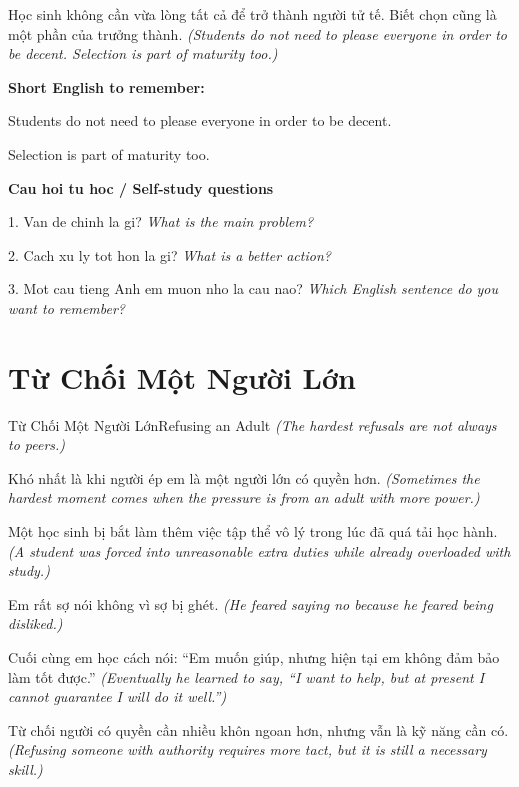\begin{baihoc}
Học sinh không cần vừa lòng tất cả để trở thành người tử tế. Biết chọn cũng là một phần của trưởng thành.
\textit{(Students do not need to please everyone in order to be decent. Selection is part of maturity too.)}
\end{baihoc}

\begin{ghinhoanh}
\textbf{Short English to remember:}

Students do not need to please everyone in order to be decent.

Selection is part of maturity too.

\end{ghinhoanh}

\begin{tuhocnhanh}
\textbf{Cau hoi tu hoc / Self-study questions}

1. Van de chinh la gi? \textit{What is the main problem?}

2. Cach xu ly tot hon la gi? \textit{What is a better action?}

3. Mot cau tieng Anh em muon nho la cau nao? \textit{Which English sentence do you want to remember?}
\end{tuhocnhanh}
\ngancach

\section{Từ Chối Một Người Lớn}
\begin{truyen}{Từ Chối Một Người Lớn}{Refusing an Adult}
\textit{(The hardest refusals are not always to peers.)}

Khó nhất là khi người ép em là một người lớn có quyền hơn.
\textit{(Sometimes the hardest moment comes when the pressure is from an adult with more power.)}

Một học sinh bị bắt làm thêm việc tập thể vô lý trong lúc đã quá tải học hành.
\textit{(A student was forced into unreasonable extra duties while already overloaded with study.)}

Em rất sợ nói không vì sợ bị ghét.
\textit{(He feared saying no because he feared being disliked.)}

Cuối cùng em học cách nói: ``Em muốn giúp, nhưng hiện tại em không đảm bảo làm tốt được.''
\textit{(Eventually he learned to say, ``I want to help, but at present I cannot guarantee I will do it well.'')}

Từ chối người có quyền cần nhiều khôn ngoan hơn, nhưng vẫn là kỹ năng cần có.
\textit{(Refusing someone with authority requires more tact, but it is still a necessary skill.)}

\end{truyen}

